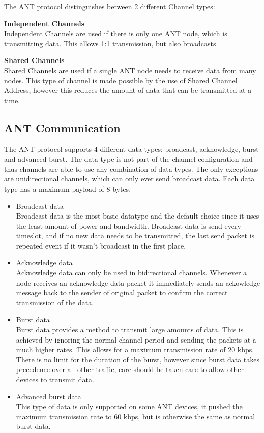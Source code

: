 The ANT protocol distinguishes between 2 different Channel types:
\begin{description}
\item{\textbf{Independent Channels}} \hfill \\ Independent Channels are used if there is only one ANT node, which is transmitting data. This allows 1:1 transmission, but also broadcasts.
\item{\textbf{Shared Channels}} \hfill \\ Shared Channels are used if a single ANT node needs to receive data from many nodes. This type of channel is made possible by the use of Shared Channel Address, however this reduces the amount of data that can be transmitted at a time.
\end{description}

\subsection{ANT Communication}
The ANT protocol supports 4 different data types: broadcast, acknowledge, burst and advanced burst. The data type is not part of the channel configuration and thus channels are able to use any combination of data types. The only exceptions are unidirectional channels, which can only ever send broadcast data. Each data type has a maximum payload of 8 bytes.
\begin{itemize}
	\item{Broadcast data} \hfill \\ Broadcast data is the most basic datatype and the default choice since it uses the least amount of power and bandwidth. Broadcast data is send every timeslot, and if no new data needs to be transmitted, the last send packet is repeated event if it wasn't broadcast in the first place.
	\item{Acknowledge data} \hfill \\ Acknowledge data can only be used in bidirectional channels. Whenever a node receives an acknowledge data packet it immediately sends an ackowledge message back to the sender of original packet to confirm the correct transmission of the data.  
	\item{Burst data} \hfill \\ Burst data provides a method to transmit large amounts of data. This is achieved by ignoring the normal channel period and sending the packets at a much higher rates. This allows for a maximum transmission rate of 20 kbps. There is no limit for the duration of the burst, however since burst data takes precedence over all other traffic, care should be taken care to allow other devices to transmit data.
	\item{Advanced burst data} \hfill \\ This type of data is only supported on some ANT devices, it pushed the maximum transmission rate to 60 kbps, but is otherwise the same as normal burst data.
\end{itemize}

